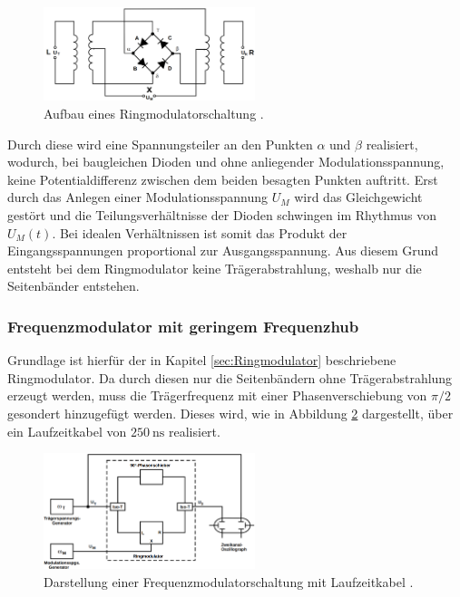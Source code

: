 \begin{figure}
    \centering
    \includegraphics[width=0.55\textwidth]{ressources/A2.png}
    \caption{Aufbau eines Ringmodulatorschaltung \cite{skript}.}
    \label{fig_02}
\end{figure}

Durch diese wird eine Spannungsteiler an den Punkten $\alpha$ und $\beta$ realisiert, wodurch, bei baugleichen Dioden und ohne anliegender Modulationsspannung, keine Potentialdifferenz zwischen dem beiden besagten Punkten auftritt. Erst durch das Anlegen einer Modulationsspannung $U_M$ wird das Gleichgewicht gestört und die Teilungsverhältnisse der Dioden schwingen im Rhythmus von $U_M(t)$. Bei idealen Verhältnissen ist somit das Produkt der Eingangsspannungen proportional zur Ausgangsspannung. Aus diesem Grund entsteht bei dem Ringmodulator keine Trägerabstrahlung, weshalb nur die Seitenbänder entstehen.

\subsubsection{Frequenzmodulator mit geringem Frequenzhub}
\label{sec:Frequenzmodulator_mit_geringem_Frequenzhub}
Grundlage ist hierfür der in Kapitel \ref{sec:Ringmodulator} beschriebene Ringmodulator. Da durch diesen nur die Seitenbändern ohne Trägerabstrahlung erzeugt werden, muss die Trägerfrequenz mit einer Phasenverschiebung von $\pi/2$ gesondert hinzugefügt werden. Dieses wird, wie in Abbildung \ref{fig_03} dargestellt, über ein Laufzeitkabel von $\SI{250}{\ns}$ realisiert. 

\begin{figure}
    \centering
    \includegraphics[width=0.55\textwidth]{ressources/A3.png}
    \caption{Darstellung einer Frequenzmodulatorschaltung mit Laufzeitkabel \cite{skript}.}
    \label{fig_03}
\end{figure}

